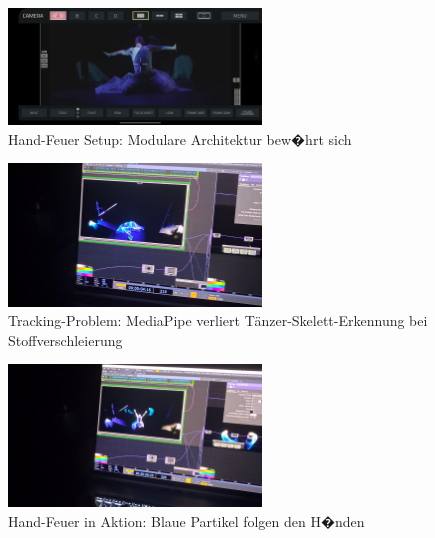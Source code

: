 \begin{figure}[!htbp]
   \centering
   \includegraphics[width=0.6\textwidth,height=0.25\textheight,keepaspectratio]{images/HQCinemaCameraPerspectiveOfHandFireToTheSidesOfTheHands.png}
   \caption{Hand-Feuer Setup: Modulare Architektur bew�hrt sich}
   \label{fig:hand_fire_setup}
\end{figure}

\begin{figure}[!htbp]
   \centering
   \includegraphics[width=0.6\textwidth,height=0.25\textheight,keepaspectratio]{images/DancerNotMediaPipeFoundCorrectlyWhenInClothOnFloor.png}
   \caption{Tracking-Problem: MediaPipe verliert Tänzer-Skelett-Erkennung bei Stoffverschleierung}
   \label{fig:cloth_tracking_issue}
\end{figure}

\begin{figure}[!htbp]
   \centering
   \includegraphics[width=0.6\textwidth,height=0.25\textheight,keepaspectratio]{images/dancerWithHandFireViewFromKinect.png}
   \caption{Hand-Feuer in Aktion: Blaue Partikel folgen den H�nden}
   \label{fig:hand_fire_action}
\end{figure}

